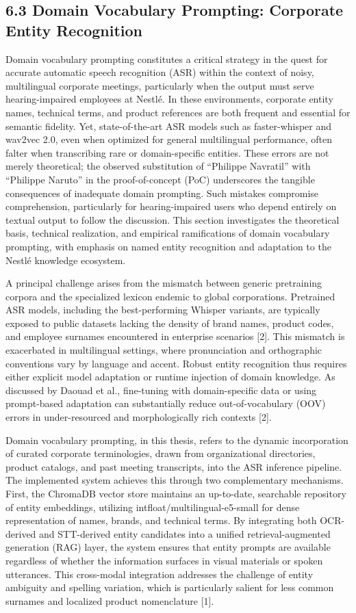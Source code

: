 \documentclass[12pt,a4paper]{article}
\begin{document}
\subsection{6.3 Domain Vocabulary Prompting: Corporate Entity Recognition}


Domain vocabulary prompting constitutes a critical strategy in the quest for accurate automatic speech recognition (ASR) within the context of noisy, multilingual corporate meetings, particularly when the output must serve hearing-impaired employees at Nestlé. In these environments, corporate entity names, technical terms, and product references are both frequent and essential for semantic fidelity. Yet, state-of-the-art ASR models such as faster-whisper and wav2vec 2.0, even when optimized for general multilingual performance, often falter when transcribing rare or domain-specific entities. These errors are not merely theoretical; the observed substitution of “Philippe Navratil” with “Philippe Naruto” in the proof-of-concept (PoC) underscores the tangible consequences of inadequate domain prompting. Such mistakes compromise comprehension, particularly for hearing-impaired users who depend entirely on textual output to follow the discussion. This section investigates the theoretical basis, technical realization, and empirical ramifications of domain vocabulary prompting, with emphasis on named entity recognition and adaptation to the Nestlé knowledge ecosystem.


A principal challenge arises from the mismatch between generic pretraining corpora and the specialized lexicon endemic to global corporations. Pretrained ASR models, including the best-performing Whisper variants, are typically exposed to public datasets lacking the density of brand names, product codes, and employee surnames encountered in enterprise scenarios [2]. This mismatch is exacerbated in multilingual settings, where pronunciation and orthographic conventions vary by language and accent. Robust entity recognition thus requires either explicit model adaptation or runtime injection of domain knowledge. As discussed by Daouad et al., fine-tuning with domain-specific data or using prompt-based adaptation can substantially reduce out-of-vocabulary (OOV) errors in under-resourced and morphologically rich contexts [2].


Domain vocabulary prompting, in this thesis, refers to the dynamic incorporation of curated corporate terminologies, drawn from organizational directories, product catalogs, and past meeting transcripts, into the ASR inference pipeline. The implemented system achieves this through two complementary mechanisms. First, the ChromaDB vector store maintains an up-to-date, searchable repository of entity embeddings, utilizing intfloat/multilingual-e5-small for dense representation of names, brands, and technical terms. By integrating both OCR-derived and STT-derived entity candidates into a unified retrieval-augmented generation (RAG) layer, the system ensures that entity prompts are available regardless of whether the information surfaces in visual materials or spoken utterances. This cross-modal integration addresses the challenge of entity ambiguity and spelling variation, which is particularly salient for less common surnames and localized product nomenclature [1].
\end{document}
